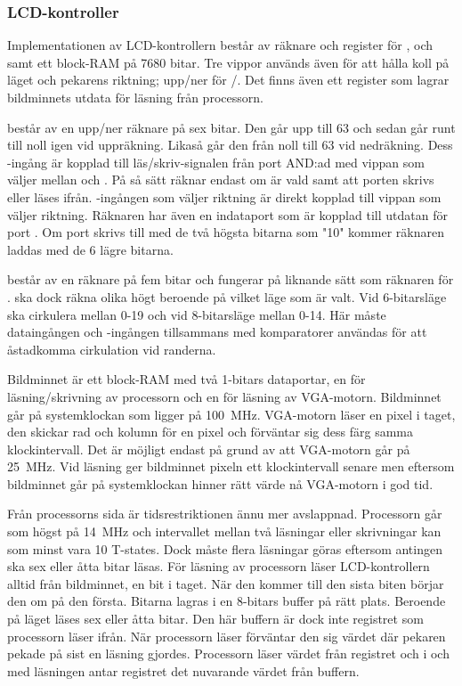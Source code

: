 \documentclass[main.tex]{subfiles}
\begin{document}
\subsubsection{LCD-kontroller}
Implementationen av LCD-kontrollern består av räknare och register för
,  och  samt ett block-RAM på 7680 bitar. Tre vippor
används även för att hålla koll på läget och pekarens riktning; upp/ner för
/. Det finns även ett register som lagrar bildminnets utdata
för läsning från processorn.

 består av en upp/ner räknare på sex bitar. Den går upp till 63 och
sedan går runt till noll igen vid uppräkning. Likaså går den från noll till 63
vid nedräkning. Dess -ingång är kopplad till läs/skriv-signalen från
port  AND:ad med vippan som väljer mellan  och . På så
sätt räknar  endast om  är vald samt att porten skrivs eller
läses ifrån. -ingången som väljer riktning är direkt kopplad till
vippan som väljer riktning. Räknaren har även en indataport som är kopplad till
utdatan för port . Om port  skrivs till med de två högsta
bitarna som "10" kommer räknaren laddas med de 6 lägre bitarna.

 består av en räknare på fem bitar och fungerar på liknande sätt som
räknaren för .  ska dock räkna olika högt beroende på vilket
läge som är valt. Vid 6-bitarsläge ska  cirkulera mellan 0-19 och vid
8-bitarsläge mellan 0-14. Här måste dataingången och -ingången
tillsammans med komparatorer användas för att åstadkomma cirkulation vid
randerna.

Bildminnet är ett block-RAM med två 1-bitars dataportar, en för
läsning/skrivning av processorn och en för läsning av VGA-motorn. Bildminnet
går på systemklockan som ligger på \SI{100}{\mega\hertz}. VGA-motorn läser en
pixel i taget, den skickar rad och kolumn för en pixel och förväntar sig dess
färg samma klockintervall. Det är möjligt endast på grund av att VGA-motorn går
på \SI{25}{\mega\hertz}. Vid läsning ger bildminnet pixeln ett klockintervall
senare men eftersom bildminnet går på systemklockan hinner rätt värde nå
VGA-motorn i god tid.

Från processorns sida är tidsrestriktionen ännu mer avslappnad. Processorn går
som högst på \SI{14}{\mega\hertz} och intervallet mellan två läsningar eller
skrivningar kan som minst vara 10 T-states. Dock måste flera läsningar göras
eftersom antingen ska sex eller åtta bitar läsas. För läsning av processorn
läser LCD-kontrollern alltid från bildminnet, en bit i taget. När den kommer
till den sista biten börjar den om på den första. Bitarna lagras i en 8-bitars
buffer på rätt plats. Beroende på läget läses sex eller åtta bitar. Den här
buffern är dock inte registret som processorn läser ifrån. När processorn läser
förväntar den sig värdet där pekaren pekade på sist en läsning gjordes.
Processorn läser värdet från registret och i och med läsningen antar registret
det nuvarande värdet från buffern.
\end{document}
